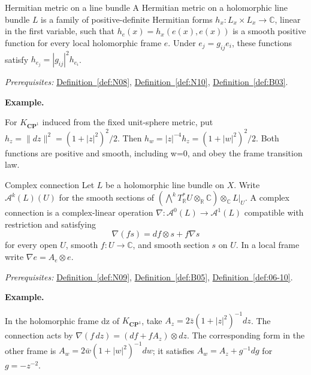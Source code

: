 \documentclass[11pt]{article}
\makeatletter
\newcommand{\R}{\mathbb R}
\newcommand{\C}{\mathbb C}
\newcounter{definition}
\newcommand{\CP}{\mathbf{CP}}
\newcommand{\exampleheading}{\par\medskip\textbf{Example.}\par\smallskip}
\newcommand{\currentdefinition}[1]{\protected@edef\@currentlabel{#1}}
\makeatother
\begin{document}
\begin{definitionbox}{Hermitian metric on a line bundle}
\currentdefinition{\thedefinition}
\label{def:N28}
A Hermitian metric on a holomorphic line bundle $L$ is a family of positive-definite Hermitian forms $h_x:L_x\times L_x\to\C$, linear in the first variable, such that $h_e(x)=h_x(e(x),e(x))$ is a smooth positive function for every local holomorphic frame $e$. Under $e_j=g_{ij}e_i$, these functions satisfy $h_{e_j}=|g_{ij}|^2h_{e_i}$.

\smallskip
\textit{Prerequisites:} \hyperref[def:N08]{Definition~\ref*{def:N08}}, \hyperref[def:N10]{Definition~\ref*{def:N10}}, \hyperref[def:B03]{Definition~\ref*{def:B03}}.

\exampleheading
For $K_{\CP^1}$ induced from the fixed unit-sphere metric, put $h_z=\|dz\|^2=(1+|z|^2)^2/2$. Then $h_w=|z|^{-4}h_z=(1+|w|^2)^2/2$. Both functions are positive and smooth, including w=0, and obey the frame transition law.
\end{definitionbox}

\begin{definitionbox}{Complex connection}
\currentdefinition{\thedefinition}
\label{def:N29}
Let $L$ be a holomorphic line bundle on $X$. Write $\mathcal A^k(L)(U)$ for the smooth sections of $(\bigwedge^kT^*_{\R}U\otimes_{\R}\C)\otimes_{\C}L|_U$. A complex connection is a complex-linear operation $\nabla:\mathcal A^0(L)\to\mathcal A^1(L)$ compatible with restriction and satisfying
\[\nabla(fs)=df\otimes s+f\nabla s\]
for every open $U$, smooth $f:U\to\C$, and smooth section $s$ on $U$. In a local frame write $\nabla e=A_e\otimes e$.

\smallskip
\textit{Prerequisites:} \hyperref[def:N09]{Definition~\ref*{def:N09}}, \hyperref[def:B05]{Definition~\ref*{def:B05}}, \hyperref[def:06-10]{Definition~\ref*{def:06-10}}.

\exampleheading
In the holomorphic frame dz of $K_{\CP^1}$, take $A_z=2\bar z(1+|z|^2)^{-1}dz$. The connection acts by $\nabla(f\,dz)=(df+fA_z)\otimes dz$. The corresponding form in the other frame is $A_w=2\bar w(1+|w|^2)^{-1}dw$; it satisfies $A_w=A_z+g^{-1}dg$ for $g=-z^{-2}$.
\end{definitionbox}
\end{document}
